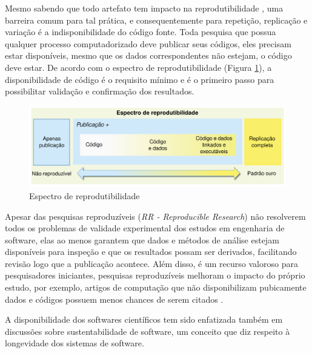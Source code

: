 Mesmo sabendo que todo artefato tem impacto na reprodutibilidade
\cite{gonzalez2012reproducibility}, uma barreira comum para tal prática, e
consequentemente para repetição, replicação e variação é a indisponibilidade do
código fonte. Toda pesquisa que possua qualquer processo computadorizado deve
publicar seus códigos, eles precisam estar disponíveis, mesmo que os dados
correspondentes não estejam, o código deve estar. De acordo com o espectro de
reprodutibilidade (Figura \ref{reproducibility-spectrum}), a disponibilidade de
código é o requisito mínimo e é o primeiro passo para possibilitar validação e
confirmação dos resultados.

\begin{figure}[h]
  \center
  \includegraphics[scale=0.35]{imagens/reproducibility-spectrum-ptbr.png}
  \caption{Espectro de reprodutibilidade \cite{Peng2011}}
  \label{reproducibility-spectrum}
\end{figure}

Apesar das pesquisas reproduzíveis ({\it RR - Reproducible Research}) não
resolverem todos os problemas de validade experimental dos estudos em
engenharia de software, elas ao menos garantem que dados e métodos de análise
estejam disponíveis para inspeção e que os resultados possam ser derivados,
facilitando revisão logo que a publicação acontece. Além disso, é um recurso
valoroso para pesquisadores iniciantes, pesquisas reproduzíveis melhoram o
impacto do próprio estudo, por exemplo, artigos de computação que não
disponibilizam pubicamente dados e códigos possuem menos chances de serem
citados \cite{madeyski2017would}.

A disponibilidade dos softwares científicos tem sido enfatizada também em
discussões sobre sustentabilidade de software, um conceito que diz respeito
à longevidade dos sistemas de software.

